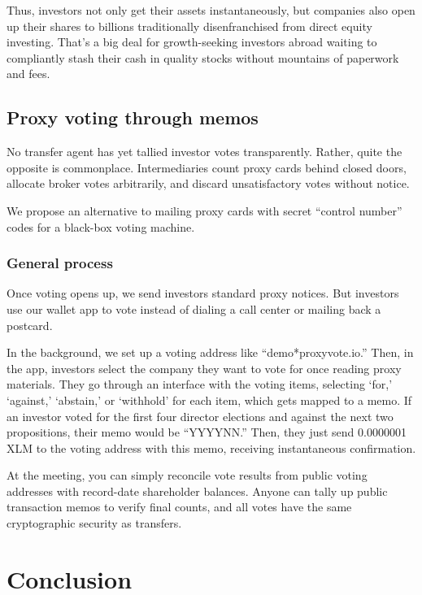 \documentclass[11pt, english]{article}
\begin{document}
\begin{multicols}{2}
Thus, investors not only get their assets instantaneously, but companies also open up their shares to billions traditionally disenfranchised from direct equity investing. That's a big deal for growth-seeking investors abroad waiting to compliantly stash their cash in quality stocks without mountains of paperwork and fees.


\subsection{Proxy voting through memos}

No transfer agent has yet tallied investor votes transparently. Rather, quite the opposite is commonplace. Intermediaries count proxy cards behind closed doors, allocate broker votes arbitrarily, and discard unsatisfactory votes without notice. \cite{Clayton_et_2018,Higgins_2015}

We propose an alternative to mailing proxy cards with secret ``control number'' codes for a black-box voting machine.

\subsubsection{General process}

Once voting opens up, we send investors standard proxy notices. But investors use our wallet app to vote instead of dialing a call center or mailing back a postcard.

In the background, we set up a voting address like ``demo*proxyvote.io.'' Then, in the app, investors select the company they want to vote for once reading proxy materials. They go through an interface with the voting items, selecting `for,' `against,' `abstain,' or `withhold' for each item, which gets mapped to a memo. If an investor voted for the first four director elections and against the next two propositions, their memo would be ``YYYYNN.'' Then, they just send 0.0000001 XLM to the voting address with this memo, receiving instantaneous confirmation.

At the meeting, you can simply reconcile vote results from public voting addresses with record-date shareholder balances. Anyone can tally up public transaction memos to verify final counts, and all votes have the same cryptographic security as transfers.



\section{Conclusion}


\end{multicols}
\end{document}

